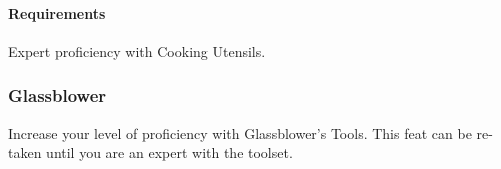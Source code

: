     \paragraph{Requirements} Expert proficiency with Cooking Utensils.

%

\subsubsection{Glassblower} \label{feat::glassblower}
    Increase your level of proficiency with Glassblower's Tools.
    This feat can be re-taken until you are an expert with the toolset.

